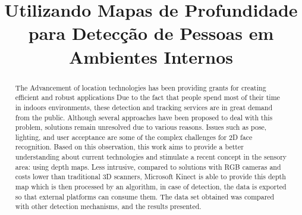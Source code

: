 \documentclass[conference]{IEEEtran}
\begin{document}
\title{Utilizando Mapas de Profundidade para Detecção de Pessoas em Ambientes Internos}

\author{

\and
{}
}

\maketitle

{
\begin{abstract}
The Advancement of location technologies has been providing grants for creating efficient and robust applications
Due to the fact that people spend most of their time in indoors environments, these detection and tracking services are in great demand from the public. Although several approaches have been proposed to deal with this problem, solutions remain unresolved due to various reasons. Issues such as pose, lighting, and user acceptance are some of the complex challenges for 2D face recognition. Based on this observation, this work aims to provide a better understanding about current technologies and stimulate a recent concept in the sensory area: using depth maps. Less intrusive, compared to solutions with RGB cameras and costs lower than traditional 3D scanners, Microsoft Kinect is able to provide this depth map which is then processed by an algorithm, in case of detection, the data is exported so that external platforms can consume them. The data set obtained was compared with other detection mechanisms, and the results presented.
\end{abstract}}
\end{document}
